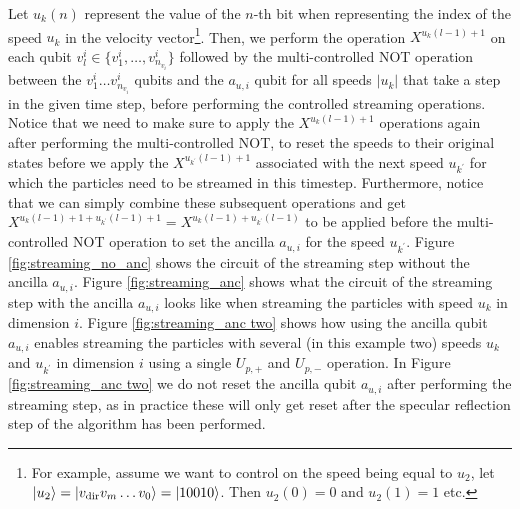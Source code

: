 Let ${u_{k}(n)}$ represent the value of the $n$-th bit when representing the index of the speed $u_{k}$ in the velocity vector\footnote{For example, assume we want to control on the speed being equal to $u_2$, let $\ket{u_2} = \ket{v_\text{dir}v_m \dots v_0} = \ket{10010}$. Then ${u_{2}(0)} = 0$ and ${u_{2}(1)} = 1$ etc. }. Then, we perform the operation $X^{u_k(l-1)+1}$ on each qubit $v^i_l \in \{v^i_{1}, \dots, v^i_{n_{v_i}}\}$ followed by the multi-controlled NOT operation between the $v^i_{1} \dots v^i_{n_{v_i}}$ qubits and the $a_{u,i}$ qubit for all speeds $|u_k|$ that take a step in the given time step, before performing the controlled streaming operations. Notice that we need to make sure to apply the $X^{u_k(l-1)+1}$ operations again after performing the multi-controlled NOT, to reset the speeds to their original states before we apply the $X^{u_{k^\prime}(l-1)+1}$ associated with the next speed $u_{k^\prime}$ for which the particles need to be streamed in this timestep. Furthermore, notice that we can simply combine these subsequent operations and get $X^{u_k(l-1)+1+u_{k^\prime}(l-1)+1} = X^{u_k(l-1)+u_{k^\prime}(l-1)}$ to be applied before the multi-controlled NOT operation to set the ancilla $a_{u,i}$ for the speed $u_{k^\prime}$. Figure \ref{fig:streaming_no_anc} shows the circuit of the streaming step without the ancilla $a_{u,i}$. Figure \ref{fig:streaming_anc} shows what the circuit of the streaming step with the ancilla $a_{u,i}$ looks like when streaming the particles with speed $u_k$ in dimension $i$. Figure \ref{fig:streaming_anc two} shows how using the ancilla qubit $a_{u,i}$ enables streaming the particles with several (in this example two) speeds $u_k$ and $u_{k^\prime}$ in dimension $i$ using a single $U_{p,+}$ and $U_{p,-}$ operation. In Figure \ref{fig:streaming_anc two} we do not reset the ancilla qubit $a_{u,i}$ after performing the streaming step, as in practice these will only get reset after the specular reflection step of the algorithm has been performed. 

